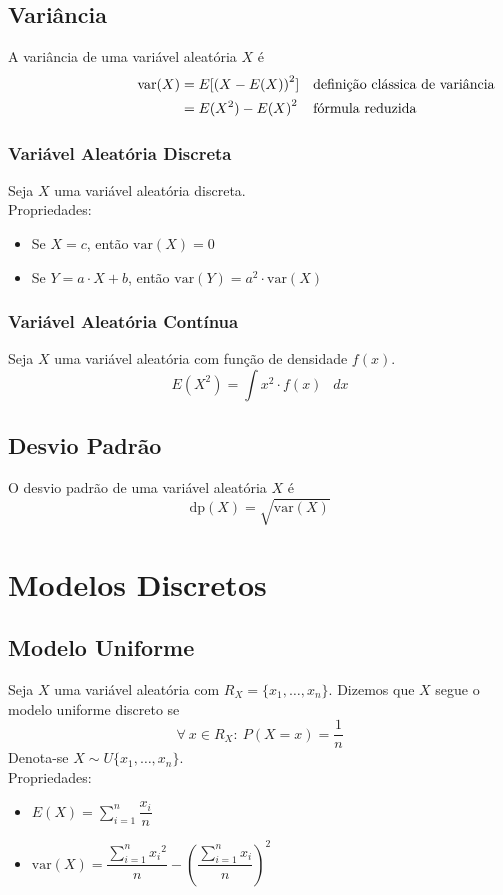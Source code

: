 \documentclass{article}
\newcommand*\diff{\mathop{}\!d}
\begin{document}
\pagebreak


\subsection{Variância}
A variância de uma variável aleatória $X$ é
\begin{align*}
  \hspace{80px} \text{var}(X) & = E[{(X - E(X))}^2] && \text{definição clássica de variância} \\
  & = E(X^2) - {E(X)}^2 && \text{fórmula reduzida}
\end{align*}

\subsubsection{Variável Aleatória Discreta}
Seja $X$ uma variável aleatória discreta. \\[5pt]
Propriedades:
\begin{itemize}
  \item Se $X = c$, então $\text{var}(X) = 0$
  \item Se $Y = a \cdot X + b$, então $\text{var}(Y) = a^2 \cdot \text{var}(X)$
\end{itemize}

\subsubsection{Variável Aleatória Contínua}
Seja $X$ uma variável aleatória com função de densidade $f(x)$. \\
\[ E(X^2) = \int x^2 \cdot f(x) \> \diff x\]


\subsection{Desvio Padrão}
O desvio padrão de uma variável aleatória $X$ é
\[ \text{dp}(X) = \sqrt{\text{var}(X)} \]



\section{Modelos Discretos}


\subsection{Modelo Uniforme}
Seja $X$ uma variável aleatória com $R_X = \{ x_1, \hdots, x_n \}$. Dizemos que $X$ segue o modelo uniforme discreto se
\[ \forall\: x \in R_X :\> P(X = x) = \frac{1}{n} \]
Denota-se $X \sim U\{x_1, \hdots, x_n\}$. \\[10pt]
Propriedades:
\begin{itemize}
  \item $E(X) = \sum\limits_{i=1}^{n} \dfrac{x_i}{n}$
  \item $\text{var}(X) = \dfrac{\sum\limits_{i=1}^{n} {x_i}^2}{n} - {\left( \dfrac{\sum\limits_{i=1}^{n} x_i}{n} \right)}^2$
\end{itemize}
\end{document}
